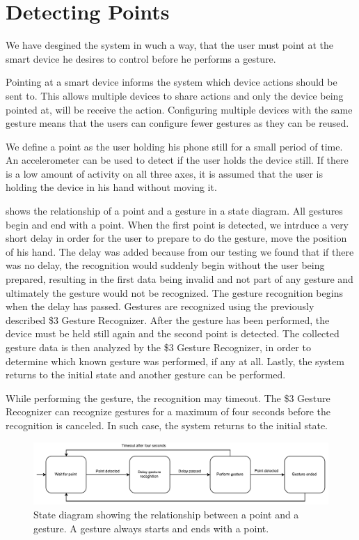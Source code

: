 \section{Detecting Points}\label{sec:detecting-points}

We have desgined the system in wuch a way, that the user must point at the smart device he desires to control before he performs a gesture.

Pointing at a smart device informs the system which device actions should be sent to. This allows multiple devices to share actions and only the device being pointed at, will be receive the action. Configuring multiple devices with the same gesture means that the users can configure fewer gestures as they can be reused.

We define a point as the user holding his phone still for a small period of time. 
An accelerometer can be used to detect if the user holds the device still. 
If there is a low amount of activity on all three axes, 
it is assumed that the user is holding the device in his hand without moving it.

 shows the relationship of a point and a gesture in a state diagram. 
All gestures begin and end with a point. 
When the first point is detected, 
we intrduce a very short delay in order for the user to prepare to do the gesture, 
\eg move the position of his hand. 
The delay was added because from our testing we found that if there was no delay, the recognition would suddenly begin without the user being prepared, resulting in the first data being invalid and not part of any gesture and ultimately the gesture would not be recognized.
The gesture recognition begins when the delay has passed. 
Gestures are recognized using the previously described \$3 Gesture Recognizer. 
After the gesture has been performed, 
the device must be held still again and the second point is detected. 
The collected gesture data is then analyzed by the \$3 Gesture Recognizer, 
in order to determine which known gesture was performed, if any at all. 
Lastly, the system returns to the initial state and another gesture can be performed.

While performing the gesture, the recognition may timeout. 
The \$3 Gesture Recognizer can recognize gestures for a maximum of four seconds before the recognition is canceled. 
In such case, the system returns to the initial state.

\begin{figure}[h]
\centering
\includegraphics[width=\textwidth]{images/point-to-gesture-state-diagram}
\caption{State diagram showing the relationship between a point and a gesture. A gesture always starts and ends with a point.}
\label{fig:point-to-gesture-state-diagram}
\end{figure}

